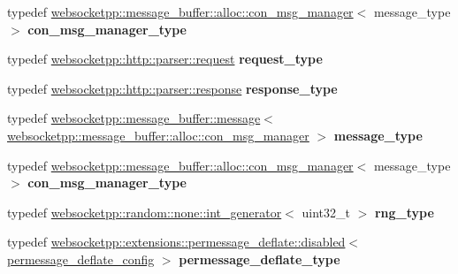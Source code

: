 \begin{DoxyCompactItemize}
\item 
typedef \hyperlink{classwebsocketpp_1_1message__buffer_1_1alloc_1_1con__msg__manager}{websocketpp\+::message\+\_\+buffer\+::alloc\+::con\+\_\+msg\+\_\+manager}$<$ message\+\_\+type $>$ {\bfseries con\+\_\+msg\+\_\+manager\+\_\+type}\hypertarget{structstub__config_a590413e515623cd51f1cd6c0f72f1018}{}\label{structstub__config_a590413e515623cd51f1cd6c0f72f1018}

\item 
typedef \hyperlink{classwebsocketpp_1_1http_1_1parser_1_1request}{websocketpp\+::http\+::parser\+::request} {\bfseries request\+\_\+type}\hypertarget{structstub__config_a7d7d444e1d7b2882bf22746be5c25f37}{}\label{structstub__config_a7d7d444e1d7b2882bf22746be5c25f37}

\item 
typedef \hyperlink{classwebsocketpp_1_1http_1_1parser_1_1response}{websocketpp\+::http\+::parser\+::response} {\bfseries response\+\_\+type}\hypertarget{structstub__config_af1ff5c46d4fc72bce3b5fb9f6090f4d6}{}\label{structstub__config_af1ff5c46d4fc72bce3b5fb9f6090f4d6}

\item 
typedef \hyperlink{classwebsocketpp_1_1message__buffer_1_1message}{websocketpp\+::message\+\_\+buffer\+::message}$<$ \hyperlink{classwebsocketpp_1_1message__buffer_1_1alloc_1_1con__msg__manager}{websocketpp\+::message\+\_\+buffer\+::alloc\+::con\+\_\+msg\+\_\+manager} $>$ {\bfseries message\+\_\+type}\hypertarget{structstub__config_a251ee9935f06ff126dbdcae6af183493}{}\label{structstub__config_a251ee9935f06ff126dbdcae6af183493}

\item 
typedef \hyperlink{classwebsocketpp_1_1message__buffer_1_1alloc_1_1con__msg__manager}{websocketpp\+::message\+\_\+buffer\+::alloc\+::con\+\_\+msg\+\_\+manager}$<$ message\+\_\+type $>$ {\bfseries con\+\_\+msg\+\_\+manager\+\_\+type}\hypertarget{structstub__config_a590413e515623cd51f1cd6c0f72f1018}{}\label{structstub__config_a590413e515623cd51f1cd6c0f72f1018}

\item 
typedef \hyperlink{classwebsocketpp_1_1random_1_1none_1_1int__generator}{websocketpp\+::random\+::none\+::int\+\_\+generator}$<$ uint32\+\_\+t $>$ {\bfseries rng\+\_\+type}\hypertarget{structstub__config_aeea6c7fab96f8cc229d78a822ff9cc5d}{}\label{structstub__config_aeea6c7fab96f8cc229d78a822ff9cc5d}

\item 
typedef \hyperlink{classwebsocketpp_1_1extensions_1_1permessage__deflate_1_1disabled}{websocketpp\+::extensions\+::permessage\+\_\+deflate\+::disabled}$<$ \hyperlink{structstub__config_1_1permessage__deflate__config}{permessage\+\_\+deflate\+\_\+config} $>$ {\bfseries permessage\+\_\+deflate\+\_\+type}\hypertarget{structstub__config_a542a8c30b8eec0e129d9487b3a598bdb}{}\label{structstub__config_a542a8c30b8eec0e129d9487b3a598bdb}


\end{DoxyCompactItemize}
